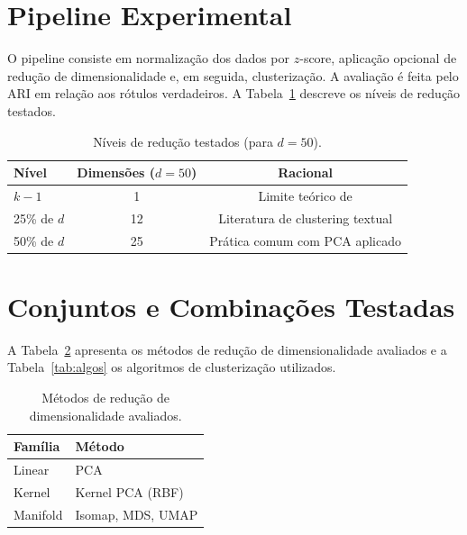 \documentclass[12pt,a4paper]{report}
\begin{document}
\section{Pipeline Experimental}

O pipeline consiste em normalização dos dados por $z$-score, aplicação
opcional de redução de dimensionalidade e, em seguida, clusterização. A
avaliação é feita pelo ARI em relação aos rótulos verdadeiros. A
Tabela~\ref{tab:niveis} descreve os níveis de redução testados.

\begin{table}[ht]
  \centering
  \caption{Níveis de redução testados (para $d = 50$).}
  \label{tab:niveis}
  \begin{tabular}{lcc}
    \toprule
    Nível        & Dimensões ($d=50$) & Racional \\
    \midrule
    $k - 1$      & 1  & Limite teórico de \citet{ding2004}\\
    25\% de $d$  & 12 & Literatura de clustering textual \\
    50\% de $d$  & 25 & Prática comum com PCA aplicado \\
    \bottomrule
  \end{tabular}
\end{table}

\section{Conjuntos e Combinações Testadas}

A Tabela~\ref{tab:dr} apresenta os métodos de redução de dimensionalidade
avaliados e a Tabela~\ref{tab:algos} os algoritmos de clusterização
utilizados.

\begin{table}[ht]
  \centering
  \caption{Métodos de redução de dimensionalidade avaliados.}
  \label{tab:dr}
  \begin{tabular}{ll}
    \toprule
    Família  & Método           \\
    \midrule
    Linear   & PCA              \\
    Kernel   & Kernel PCA (RBF) \\
    Manifold & Isomap, MDS, UMAP\\
    \bottomrule
  \end{tabular}
\end{table}
\end{document}
